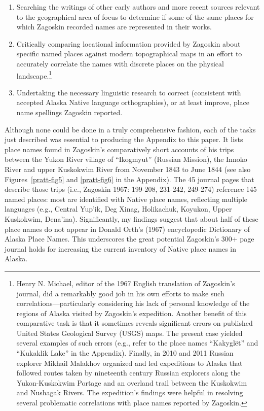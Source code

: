 \begin{enumerate}

    \item  Searching the writings of other early authors and more recent sources relevant to the geographical area of focus to determine if some of the same places for which Zagoskin recorded names are represented in their works.
    \item Critically comparing locational information provided by Zagoskin about specific named places against modern topographical maps in an effort to accurately correlate the names with discrete places on the physical landscape.\footnote{Henry N. Michael, editor of the 1967 English translation of Zagoskin’s journal, did a remarkably good job in his own efforts to make such correlations—particularly considering his lack of personal knowledge of the regions of Alaska visited by Zagoskin’s expedition. Another benefit of this comparative task is that it sometimes reveals significant errors on published United States Geological Survey (USGS) maps. The present case yielded several examples of such errors (e.g., refer to the place names “Kakyglët” and “Kukaklik Lake” in the Appendix). Finally, in 2010 and 2011 Russian explorer Mikhail Malakhov organized and led expeditions to Alaska that followed routes taken by nineteenth century Russian explorers along the Yukon-Kuskokwim Portage and an overland trail between the Kuskokwim and Nushagak Rivers. The expedition’s findings were helpful in resolving several problematic correlations with place names reported by Zagoskin.}
    \item Undertaking the necessary linguistic research to correct (consistent with accepted Alaska Native language orthographies), or at least improve, place name spellings Zagoskin reported.
\end{enumerate}

Although none could be done in a truly comprehensive fashion, each of the tasks just described was essential to producing the Appendix to this paper. It lists place names found in Zagoskin’s comparatively short accounts of his trips between the Yukon River village of “Ikogmyut” (Russian Mission), the Innoko River and upper Kuskokwim River from November 1843 to June 1844 (see also Figures~\ref{pratt-fig5} and \ref{pratt-fig6} in the Appendix). The 45 journal pages that describe those trips (i.e., Zagoskin 1967: 199-208, 231-242, 249-274) reference 145 named places: most are identified with Native place names, reflecting multiple languages (e.g., Central Yup’ik, Deg Xinag, Holikachuk, Koyukon, Upper Kuskokwim, Dena’ina). Significantly, my findings suggest that about half of these place names do not appear in Donald Orth’s (1967) encyclopedic Dictionary of Alaska Place Names. This underscores the great potential Zagoskin’s 300+ page journal holds for increasing the current inventory of Native place names in Alaska.


